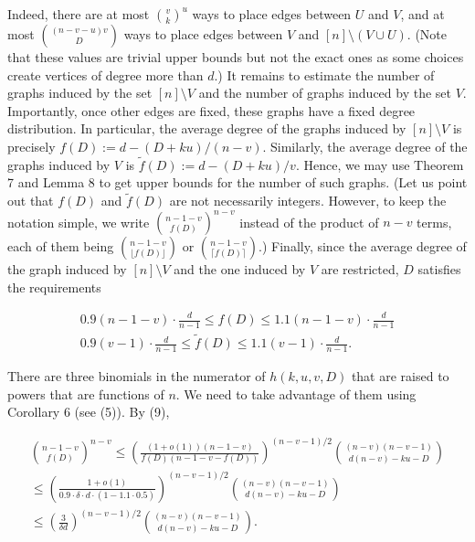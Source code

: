 Indeed, there are at most ${v\choose k}^{u}$ ways to place edges between $U$ and $V$, and at most ${(n-v-u)v\choose D}$ ways to place edges between $V$ and $[n]\setminus(V\cup U)$. (Note that these values are trivial upper bounds but not the exact ones as some choices create vertices of degree more than $d$.) It remains to estimate the number of graphs induced by the set $[n]\setminus V$ and the number of graphs induced by the set $V$. Importantly, once other edges are fixed, these graphs have a fixed degree distribution. In particular, the average degree of the graphs induced by $[n]\setminus V$ is precisely $f(D):=d-(D+ku)/(n-v)$. Similarly, the average degree of the graphs induced by $V$ is $\tilde{f}(D):=d-(D+ku)/v$. Hence, we may use Theorem 7 and Lemma 8 to get upper bounds for the number of such graphs. (Let us point out that $f(D)$ and $\tilde{f}(D)$ are not necessarily integers. However, to keep the notation simple, we write ${n-1-v\choose f(D)}^{n-v}$ instead of the product of $n-v$ terms, each of them being ${n-1-v\choose\lfloor f(D)\rfloor}$ or ${n-1-v\choose\lceil f(D)\rceil}$.) Finally, since the average degree of the graph induced by $[n]\setminus V$ and the one induced by $V$ are restricted, $D$ satisfies the requirements\par


\[\begin{gathered}
\displaystyle 0.9(n-1-v)\cdot\frac{d}{n-1}\leq \displaystyle f(D) \displaystyle\leq 1.1(n-1-v)\cdot\frac{d}{n-1} \\
\displaystyle 0.9(v-1)\cdot\frac{d}{n-1}\leq \displaystyle\tilde{f}(D) \displaystyle\leq 1.1(v-1)\cdot\frac{d}{n-1}.
\end{gathered}\]




There are three binomials in the numerator of $h(k,u,v,D)$ that are raised to powers that are functions of $n$. We need to take advantage of them using Corollary 6 (see (5)). By (9),\par


\[\begin{gathered}
\displaystyle{n-1-v\choose f(D)}^{n-v} \displaystyle\leq \displaystyle\left(\frac{(1+o(1))(n-1-v)}{f(D)(n-1-v-f(D))}\right)^{(n-v-1)/2}\binom{(n-v)(n-v-1)}{d(n-v)-ku-D} \\
\displaystyle\leq \displaystyle\left(\frac{1+o(1)}{0.9\cdot\delta\cdot d\cdot(1-1.1\cdot 0.5)}\right)^{(n-v-1)/2}\binom{(n-v)(n-v-1)}{d(n-v)-ku-D} \\
\displaystyle\leq \displaystyle\left(\frac{3}{\delta d}\right)^{(n-v-1)/2}\binom{(n-v)(n-v-1)}{d(n-v)-ku-D}.
\end{gathered}\]


